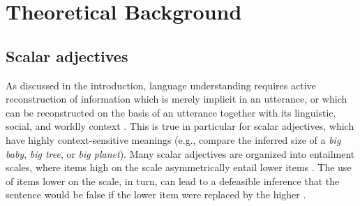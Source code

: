 \documentclass[10pt]{article}
\begin{document}
 
%

\section{Theoretical Background}
\vspace{-.2mm}
\subsection{\label{scalar-theory}Scalar adjectives}
\vspace{-.15mm}
As discussed in the introduction, language understanding requires active reconstruction of information which is merely implicit in an utterance, or which can be reconstructed on the basis of an utterance together with its linguistic, social, and worldly context \cite{grice1975logic,hobbs1993interpretation,clark1996using,hanna2003effects,piantadosi2012communicative}.
%
%
%
This is true in particular for scalar adjectives, which have highly context-sensitive meanings (e.g., compare the inferred size of a \emph{big baby}, \emph{big tree}, or \emph{big planet}). Many scalar adjectives are organized into entailment scales, where items high on the scale asymmetrically entail lower items \cite{horn89,horn2000pick}. The use of items lower on the scale, in turn, can lead to a defeasible inference that the sentence would be false if the lower item were replaced by the higher \cite{grice1975logic,horn89,lassiter10a}.
 \vspace{-.05in} 
\end{document}
